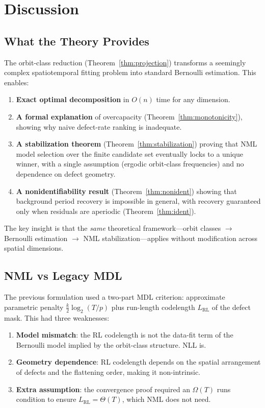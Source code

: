\documentclass[11pt]{article}
\theoremstyle{definition}
\theoremstyle{remark}
\newcommand{\RL}{\operatorname{RL}}
\begin{document}
\section{Discussion}

\subsection{What the Theory Provides}

The orbit-class reduction (Theorem~\ref{thm:projection}) transforms a seemingly complex spatiotemporal fitting problem into standard Bernoulli estimation. This enables:

\begin{enumerate}
    \item \textbf{Exact optimal decomposition} in $O(n)$ time for any dimension.
    \item \textbf{A formal explanation} of overcapacity (Theorem~\ref{thm:monotonicity}), showing why naive defect-rate ranking is inadequate.
    \item \textbf{A stabilization theorem} (Theorem~\ref{thm:stabilization}) proving that NML model selection over the finite candidate set eventually locks to a unique winner, with a single assumption (ergodic orbit-class frequencies) and no dependence on defect geometry.
    \item \textbf{A nonidentifiability result} (Theorem~\ref{thm:nonident}) showing that background period recovery is impossible in general, with recovery guaranteed only when residuals are aperiodic (Theorem~\ref{thm:ident}).
\end{enumerate}

The key insight is that the \emph{same} theoretical framework---orbit classes $\to$ Bernoulli estimation $\to$ NML stabilization---applies without modification across spatial dimensions.

\subsection{NML vs Legacy MDL}

The previous formulation used a two-part MDL criterion: approximate parametric penalty $\frac{k}{2}\log_2(T/p)$ plus run-length codelength $L_{\RL}$ of the defect mask.
This had three weaknesses:

\begin{enumerate}
    \item \textbf{Model mismatch}: the RL codelength is not the data-fit term of the Bernoulli model implied by the orbit-class structure. NLL is.
    \item \textbf{Geometry dependence}: RL codelength depends on the spatial arrangement of defects and the flattening order, making it non-intrinsic.
    \item \textbf{Extra assumption}: the convergence proof required an $\Omega(T)$ runs condition to ensure $L_{\RL} = \Theta(T)$, which NML does not need.
\end{enumerate}
\end{document}
